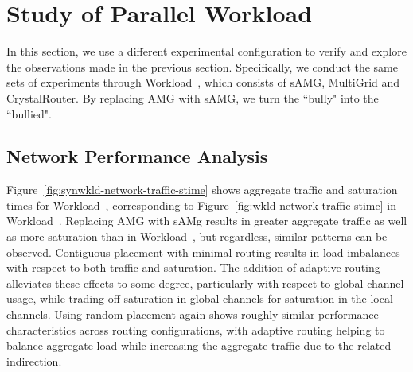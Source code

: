 
\section{Study of Parallel Workload }
\label{sec:workload-2}

In this section, we use a different experimental configuration to verify and
explore the observations made in the previous section. Specifically, we conduct
the same sets of experiments through Workload~, which consists of sAMG,
MultiGrid and CrystalRouter. By replacing AMG with sAMG, we turn the ``bully"
into the ``bullied".

\subsection{Network Performance Analysis}
\label{sec: workload-2 network analysis}

Figure~\ref{fig:synwkld-network-traffic-stime} shows aggregate traffic and
saturation times for Workload~, corresponding to
Figure~\ref{fig:wkld-network-traffic-stime} in Workload~.  Replacing
AMG with sAMg results in greater aggregate traffic as well as more saturation
than in Workload~, but regardless, similar patterns can be observed.
Contiguous placement with minimal routing results in load imbalances with
respect to both traffic and saturation. The addition of adaptive routing
alleviates these effects to some degree, particularly with respect to global
channel usage, while trading off saturation in global channels for saturation in
the local channels.  Using random placement again shows roughly similar performance
characteristics across routing configurations, with adaptive routing helping to
balance aggregate load while increasing the aggregate traffic due to the related
indirection.

